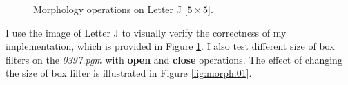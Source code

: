 \documentclass[paper=a4, fontsize=11pt]{scrartcl}
\numberwithin{equation}{section}		%
\numberwithin{figure}{section}			%
\numberwithin{table}{section}				%
\begin{document}
\begin{figure}
\centering
{}
\caption{Morphology operations on Letter J [$ 5 \times 5 $].}
\label{fig:j_letter}
\end{figure}

I use the image of Letter J to visually verify the correctness of my implementation, which is provided in Figure \ref{fig:j_letter}.
I also test different size of box filters on the \emph{0397.pgm} with \textbf{open} and \textbf{close} operations.
The effect of changing the size of box filter is illustrated in Figure \ref{fig:morph:01}.
\end{document}
